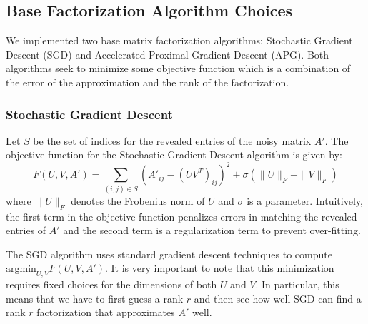 \subsection{Base Factorization Algorithm Choices}
We implemented two base matrix factorization algorithms: Stochastic Gradient Descent (SGD) and Accelerated Proximal Gradient Descent (APG). Both algorithms seek to minimize some objective function which is a combination of the error of the approximation and the rank of the factorization.
\subsubsection{Stochastic Gradient Descent}
Let $S$ be the set of indices for the revealed entries of the noisy matrix $A'$. The objective function for the Stochastic Gradient Descent algorithm is given by:
\[
F(U,V,A') = \sum_{(i,j)\in S} \left(A'_{ij} - (UV^T)_{ij}\right)^2 + \sigma (\| U\|_F  + \| V\|_F)
\]
where $\|U\|_F$ denotes the Frobenius norm of $U$ and $\sigma$ is a parameter. Intuitively, the first term in the objective function penalizes errors in matching the revealed entries of $A'$ and the second term is a regularization term to prevent over-fitting.

The SGD algorithm uses standard gradient descent techniques to compute $\mbox{argmin}_{U,V} F(U,V,A')$. It is very important to note that this minimization requires fixed choices for the dimensions of both $U$ and $V$. In particular, this means that we have to first guess a rank $r$ and then see how well SGD can find a rank $r$ factorization that approximates $A'$ well.
